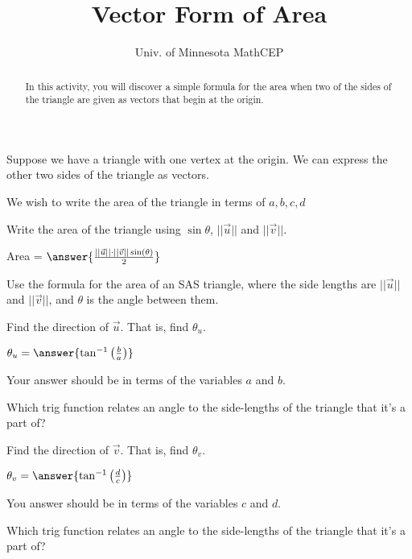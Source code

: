 \documentclass[number]{ximera}
\title{Vector Form of Area}
\author{Univ. of Minnesota MathCEP}
\begin{document}
\begin{abstract}
  In this activity, you will discover a simple formula for the area when two of the sides of the triangle are given as vectors that begin at the origin.
\end{abstract}

\maketitle

Suppose we have a triangle with one vertex at the origin. We can express the other two sides of the triangle as vectors.

We wish to write the area of the triangle in terms of $a,b,c,d$

\bigskip


\begin{problem}
Write the area of the triangle using $\sin \theta$, $||\overrightarrow u||$ and $||\overrightarrow v||$.

Area = $\answer{\frac{||\vec{u}||\cdot||\vec{v}||\sin(\theta)}{2}}$
\begin{hint}
Use the formula for the area of an SAS triangle, where the side lengths are $||\overrightarrow u||$ and $||\overrightarrow v||$, and $\theta$ is the angle between them.
\end{hint}
\end{problem}

\begin{problem}
Find the direction of $\overrightarrow u$. That is, find $\theta_u$.

$\theta_u=\answer{\tan^{-1}\left(\frac{b}{a}\right)}$
\begin{hint}
Your answer should be in terms of the variables $a$ and $b$.
\end{hint}
\begin{hint}
Which trig function relates an angle to the side-lengths of the triangle that it's a part of?
\end{hint}
\end{problem}

\begin{problem}
Find the direction of $\overrightarrow v$. That is, find $\theta_v$.

$\theta_v=\answer{\tan^{-1}\left(\frac{d}{c}\right)}$
\begin{hint}
You answer should be in terms of the variables $c$ and $d$.
\end{hint}
\begin{hint}
Which trig function relates an angle to the side-lengths of the triangle that it's a part of?
\end{hint}
\end{problem}
\end{document}
